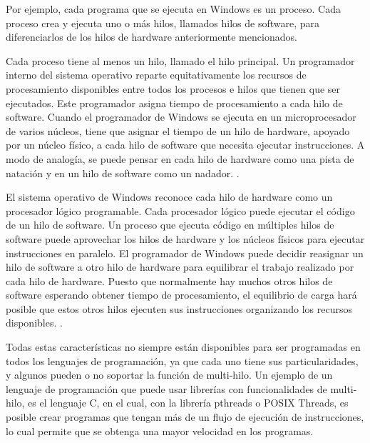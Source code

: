 \documentclass[12pt]{article}
\begin{document}
{Por ejemplo, cada programa que se ejecuta en Windows es un proceso. Cada proceso crea y ejecuta uno o más hilos, llamados hilos de software, para diferenciarlos de los hilos de hardware anteriormente mencionados.
\newline

Cada proceso tiene al menos un hilo, llamado el hilo principal. Un programador interno del sistema operativo reparte equitativamente los recursos de procesamiento disponibles entre todos los procesos e hilos que tienen que ser ejecutados. Este programador asigna tiempo de procesamiento a cada hilo de software. Cuando el programador de Windows se ejecuta en un microprocesador de varios núcleos, tiene que asignar el tiempo de un hilo de hardware, apoyado por un núcleo físico, a cada hilo de software que necesita ejecutar instrucciones. A modo de analogía, se puede pensar en cada hilo de hardware como una pista de natación y en un hilo de software como un nadador. \citep{vs}.
\newline

El sistema operativo de Windows reconoce cada hilo de hardware como un procesador lógico programable. Cada procesador lógico puede ejecutar el código de un hilo de software. Un proceso que ejecuta código en múltiples hilos de software puede aprovechar los hilos de hardware y los núcleos físicos para ejecutar instrucciones en paralelo. El programador de Windows puede decidir reasignar un hilo de software a otro hilo de hardware para equilibrar el trabajo realizado por cada hilo de hardware. Puesto que normalmente hay muchos otros hilos de software esperando obtener  tiempo de procesamiento, el equilibrio de carga hará posible que estos otros hilos ejecuten sus instrucciones organizando los recursos disponibles.
\citep{vs}.
\newline

Todas estas características no siempre están disponibles para ser programadas en todos los lenguajes de programación, ya que cada uno tiene sus particularidades, y algunos pueden o no soportar la función de multi-hilo. Un ejemplo de un lenguaje de programación que puede usar librerías con funcionalidades de multi-hilo, es el lenguaje C, en el cual, con la librería pthreads o POSIX Threads, es posible crear programas que tengan más de un flujo de ejecución de instrucciones, lo cual permite que se obtenga una mayor velocidad en los programas.


\medskip

 



}
\end{document}
